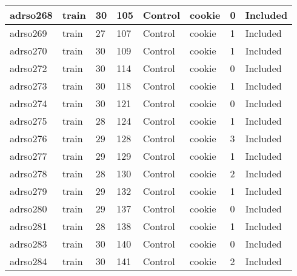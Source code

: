 \begin{center}
\begin{longtable}{|l|l|l|l|l|l|l|l|}
adrso268  & train            & 30           & 105         & Control              & cookie          & 0                & Included      \\ \hline
adrso269  & train            & 27           & 107         & Control              & cookie          & 1                & Included      \\ \hline
adrso270  & train            & 30           & 109         & Control              & cookie          & 1                & Included      \\ \hline
adrso272  & train            & 30           & 114         & Control              & cookie          & 0                & Included      \\ \hline
adrso273  & train            & 30           & 118         & Control              & cookie          & 1                & Included      \\ \hline
adrso274  & train            & 30           & 121         & Control              & cookie          & 0                & Included      \\ \hline
adrso275  & train            & 28           & 124         & Control              & cookie          & 1                & Included      \\ \hline
adrso276  & train            & 29           & 128         & Control              & cookie          & 3                & Included      \\ \hline
adrso277  & train            & 29           & 129         & Control              & cookie          & 1                & Included      \\ \hline
adrso278  & train            & 28           & 130         & Control              & cookie          & 2                & Included      \\ \hline
adrso279  & train            & 29           & 132         & Control              & cookie          & 1                & Included      \\ \hline
adrso280  & train            & 29           & 137         & Control              & cookie          & 0                & Included      \\ \hline
adrso281  & train            & 28           & 138         & Control              & cookie          & 1                & Included      \\ \hline
adrso283  & train            & 30           & 140         & Control              & cookie          & 0                & Included      \\ \hline
adrso284  & train            & 30           & 141         & Control              & cookie          & 2                & Included      \\ \hline

\end{longtable}
\end{center}
